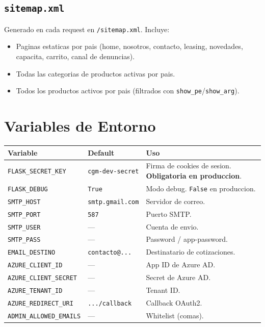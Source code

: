 \documentclass[11pt,a4paper]{article}
\begin{document}
\subsection{\texttt{sitemap.xml}}
Generado en cada request en \texttt{/sitemap.xml}. Incluye:

\begin{itemize}[leftmargin=*]
    \item Paginas estaticas por pais (home, nosotros, contacto, leasing,
        novedades, capacita, carrito, canal de denuncias).
    \item Todas las categorias de productos activas por pais.
    \item Todos los productos activos por pais (filtrados con
        \texttt{show\_pe}/\texttt{show\_arg}).
\end{itemize}

\section{Variables de Entorno}

\begin{longtable}{p{5cm} p{2cm} p{8cm}}
\toprule
\textbf{Variable} & \textbf{Default} & \textbf{Uso} \\
\midrule
\endhead
\texttt{FLASK\_SECRET\_KEY}         & \texttt{cgm-dev-secret} & Firma de cookies de sesion. \textbf{Obligatoria en produccion}. \\
\texttt{FLASK\_DEBUG}               & \texttt{True}           & Modo debug. \texttt{False} en produccion. \\
\texttt{SMTP\_HOST}                 & \texttt{smtp.gmail.com} & Servidor de correo. \\
\texttt{SMTP\_PORT}                 & \texttt{587}            & Puerto SMTP. \\
\texttt{SMTP\_USER}                 & ---                     & Cuenta de envio. \\
\texttt{SMTP\_PASS}                 & ---                     & Password / app-password. \\
\texttt{EMAIL\_DESTINO}             & \texttt{contacto@...}   & Destinatario de cotizaciones. \\
\texttt{AZURE\_CLIENT\_ID}          & ---                     & App ID de Azure AD. \\
\texttt{AZURE\_CLIENT\_SECRET}      & ---                     & Secret de Azure AD. \\
\texttt{AZURE\_TENANT\_ID}          & ---                     & Tenant ID. \\
\texttt{AZURE\_REDIRECT\_URI}       & \texttt{.../callback}   & Callback OAuth2. \\
\texttt{ADMIN\_ALLOWED\_EMAILS}     & ---                     & Whitelist (comas). \\
\bottomrule
\end{longtable}
\end{document}
